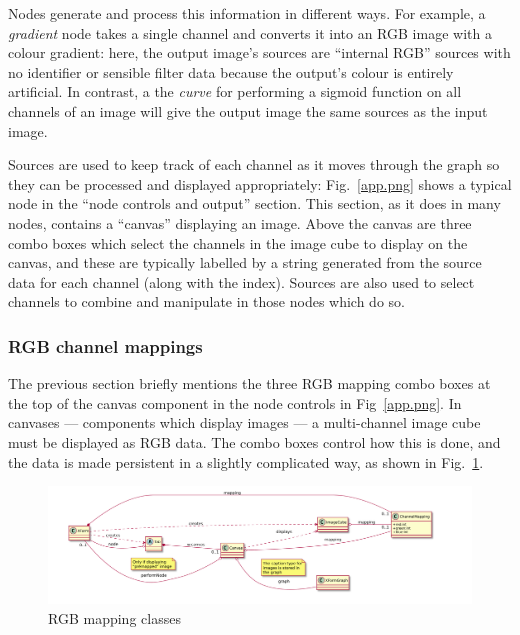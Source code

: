 Nodes generate and process this information in different ways. For example, a
\emph{gradient} node takes a single channel and converts it into an RGB image
with a colour gradient: here, the output image's sources are ``internal RGB''
sources with no identifier or sensible filter data because the output's colour
is entirely artificial. In contrast, a the \emph{curve} for performing a
sigmoid function on all channels of an image will give the output image the
same sources as the input image.

Sources are used to keep track of each channel as it moves through the graph
so they can be processed and displayed appropriately: Fig.~\ref{app.png} shows
a typical node in the ``node controls and output'' section. This section, as
it does in many nodes, contains a ``canvas'' displaying an image. Above the
canvas are three combo boxes which select the channels in the image cube to
display on the canvas, and these are typically labelled by a string generated
from the source data for each channel (along with the index). Sources are also
used to select channels to combine and manipulate in those nodes which do so.

\subsubsection{RGB channel mappings}
The previous section briefly mentions the three RGB mapping combo boxes at the
top of the canvas component in the node controls in Fig~\ref{app.png}. In
canvases --- components which display images --- a multi-channel image cube
must be displayed as RGB data. The combo boxes control how this is done, and
the data is made persistent in a slightly complicated way, as shown in Fig.~\ref{rgb.pdf}.

\begin{figure}[ht]
\center
\includegraphics[width=6in]{rgb.pdf}
\caption{RGB mapping classes}
\label{rgb.pdf}
\end{figure}

